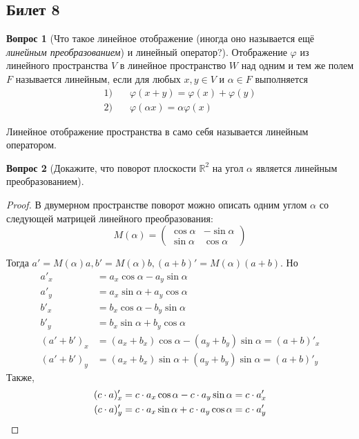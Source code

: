 \documentclass[a4paper,11pt]{article}
\theoremstyle{remark}
\theoremstyle{definition}
\newtheorem{question}{Вопрос}
\numberwithin{question}{subsection}
\begin{document}
\subsection{Билет 8}
\begin{question}[Что такое линейное отображение (иногда оно называется ещё \emph{линейным преобразованием}) и линейный оператор?]
Отображение \(\varphi\) из линейного пространства \(V\) в линейное пространство \(W\) над одним и тем же полем \(F\) называется линейным, если для любых \(x, y \in V\) и \(\alpha \in F\) выполняется
\begin{align*}
    1)\quad&\varphi(x + y) = \varphi(x) + \varphi(y) \\
    2)\quad&\varphi(\alpha{}x) = \alpha\varphi{}(x)
\end{align*}

Линейное отображение пространства в само себя называется линейным оператором.
\end{question}


\begin{question}[Докажите, что поворот плоскости \(\mathbb{R}^2\) на угол \(\alpha\) является линейным преобразованием]\(\)
\begin{proof}
В двумерном пространстве поворот можно описать одним углом \(\alpha\) со следующей матрицей линейного преобразования:
\begin{equation*}
	M(\alpha) =
	\begin{pmatrix}
		\cos \alpha & -\sin \alpha \\
		\sin \alpha & \cos \alpha
	\end{pmatrix}
\end{equation*}

Тогда \(a' = M(\alpha)a, b' = M(\alpha)b, (a+b)' = M(\alpha)(a+b)\). Но
\begin{align*}
	a'_x &= a_x \cos\alpha - a_y \sin\alpha \\
	a'_y &= a_x \sin\alpha + a_y \cos\alpha \\
	b'_x &= b_x \cos\alpha - b_y \sin\alpha \\
	b'_y &= b_x \sin\alpha + b_y \cos\alpha \\
	(a' + b')_x &= (a_x + b_x)\cos\alpha - (a_y + b_y)\sin\alpha = (a + b)'_x \\
	(a' + b')_y &= (a_x + b_x)\sin\alpha + (a_y + b_y)\sin\alpha = (a + b)'_y 
\end{align*}
Также,
\begin{align*}
	(c \cdot a)'_x &= c \cdot a_x \cos\alpha - c \cdot a_y \sin\alpha = c \cdot a'_x  \\
	(c \cdot a)'_y &= c \cdot a_x \sin\alpha + c \cdot a_y \cos\alpha = c \cdot a'_y \qedhere
\end{align*}
\end{proof}
\end{question}
\end{document}
